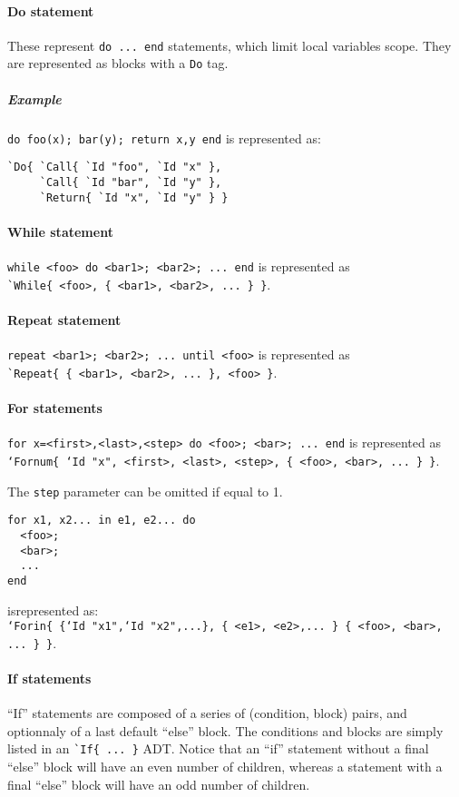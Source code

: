 \paragraph{Do statement}
These represent \verb|do ... end| statements, which limit local
variables scope. They are represented as
blocks with a \verb|Do| tag.

\subparagraph{Example}
\verb|do foo(x); bar(y); return x,y end| is represented as:
\begin{verbatim}
`Do{ `Call{ `Id "foo", `Id "x" },
     `Call{ `Id "bar", `Id "y" },
     `Return{ `Id "x", `Id "y" } }
\end{verbatim}

\paragraph{While statement}
\verb|while <foo> do <bar1>; <bar2>; ... end| is represented as \\
\verb|`While{ <foo>, { <bar1>, <bar2>, ... } }|.

\paragraph{Repeat statement} 
\verb|repeat <bar1>; <bar2>; ... until <foo>| is represented as \\
\verb|`Repeat{ { <bar1>, <bar2>, ... }, <foo> }|.

\paragraph{For statements}

{\tt for x=<first>,<last>,<step> do <foo>; <bar>; ... end} is
represented as {\tt `Fornum\{ `Id "x", <first>, <last>, <step>, \{
  <foo>, <bar>, ... \} \}}.

The \verb|step| parameter can be omitted if equal to 1.

\begin{verbatim}
for x1, x2... in e1, e2... do
  <foo>;
  <bar>;
  ...
end
\end{verbatim}
isrepresented as:\\ 
{\tt `Forin\{ \{`Id "x1",`Id "x2",...\}, \{ <e1>, <e2>,... \} \{
 <foo>, <bar>, ... \} \}}.

\paragraph{If statements}
``If'' statements are composed of a series of (condition, block)
pairs, and optionnaly of a last default ``else'' block. The conditions
and blocks are simply listed in an \verb|`If{ ... }| ADT. Notice that
an ``if'' statement without a final ``else'' block will have an even
number of children, whereas a statement with a final ``else'' block
will have an odd number of children.

